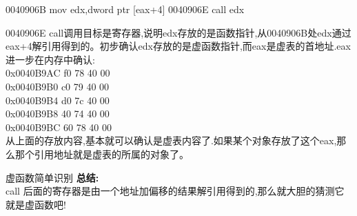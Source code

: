 \documentclass[AutoFakeBold,AutoFakeSlant]{beamer}
\begin{document}
	\begin{frame}[fragile]
		\begin{x86asmcode}
0040906B  mov   edx,dword ptr [eax+4]  
0040906E  call  edx\end{x86asmcode}
		0040906E call调用目标是寄存器,说明edx存放的是函数指针,从0040906B处edx通过eax+4解引用得到的。初步确认edx存放的是虚函数指针,而eax是虚表的首地址.eax进一步在内存中确认:\\
		0x0040B9AC  f0 78 40 00  \\
		0x0040B9B0  c0 79 40 00  \\
		0x0040B9B4  d0 7c 40 00  \\
		0x0040B9B8  40 74 40 00  \\
		0x0040B9BC  60 78 40 00  \\
		从上面的存放内容,基本就可以确认是虚表内容了.如果某个对象存放了这个eax,那么那个引用地址就是虚表的所属的对象了。
	\end{frame}
	
	\begin{frame}[fragile]{虚函数简单识别}
	    \textbf{总结:} \\ call 后面的寄存器是由一个地址加偏移的结果解引用得到的,那么就大胆的猜测它就是虚函数吧!	
	\end{frame}
	
\end{document}
